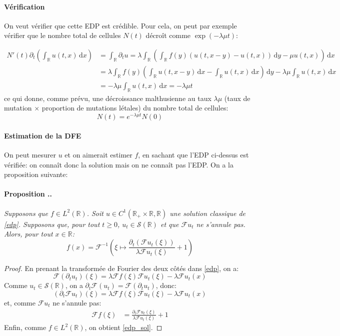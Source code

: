 \documentclass[12pt]{article}
\newcounter{prop}[section]
\newcommand{\prop}[1]{\stepcounter{prop}\paragraph{Proposition \arabic{section}.\arabic{prop}.}\textit{\newline #1}\vspace{0.1cm}}
\newcommand{\pth}[1]{\left(#1\right)}
\newcommand{\de}{\,\mathrm{d}}
\newcommand{\Er}{\mathbb{R}}
\newcommand{\dr}{\partial}
\newcommand{\fr}{\mathcal{F}}
\begin{document}
\paragraph{Vérification}

On veut vérifier que cette EDP est crédible. Pour cela, on peut par exemple vérifier que le nombre total de cellules $N(t)$ décroît comme $\exp(-\lambda\mu t)$:

\begin{align*}
    N'(t)\dr_t\pth{\int_{\Er}u(t,x)\de x}&=\int_{\Er}\dr_tu=\lambda \int_{\Er}\pth{\int_{\Er}f(y)(u(t,x-y)-u(t,x))\de y-\mu u(t,x)}\de x\\
    &=\lambda\int_{\Er}f(y)\pth{\int_{\Er}u(t,x-y)\de x-\int_{\Er}u(t,x)\de x}\de y-\lambda\mu\int_{\Er}u(t,x)\de x\\
    &=-\lambda\mu\int_{\Er}u(t,x)\de x=-\lambda\mu t
\end{align*}
ce qui donne, comme prévu, une décroissance malthusienne au taux $\lambda\mu$ (taux de mutation $\times$ proportion de mutations létales) du nombre total de cellules:
\[N(t)=e^{-\lambda\mu t}N(0)\]

\paragraph{Estimation de la DFE}

On peut mesurer $u$ et on aimerait estimer $f$, en sachant que l'EDP ci-dessus est vérifiée:  on connaît donc la solution mais on ne connaît pas l'EDP. On a la proposition suivante:
\prop{Supposons que $f\in L^2(\Er)$. Soit $u\in C^1(\Er_+\times \Er,\Er)$ une solution classique de \eqref{edp}. Supposons que, pour tout $t\geqslant 0$, $u_t\in \mathcal{S}(\Er)$ et que $\fr u_t$ ne s'annule pas. \\Alors, pour tout $x\in\mathbb{R}$:
  \begin{equation}\label{edp_sol}
    f(x)=\fr^{-1}\pth{\xi\mapsto\frac{\dr_t\pth{\fr u_t(\xi)}}{\lambda\fr u_t(\xi)}+1}    
  \end{equation}
}

\begin{proof}
  En prenant la transformée de Fourier des deux côtés dans \eqref{edp}, on a:
\[\fr \pth{\dr_tu_t}(\xi)=\lambda \fr f(\xi)\fr {u_t}(\xi)-\lambda\fr u_t(x)\]
Comme $u_t\in \mathcal{S}(\Er)$, on a $\dr_t\fr(u_t)=\fr(\dr_tu_t)$, donc:
\[\pth{\dr_t\fr u_t}(\xi)=\lambda \fr f(\xi)\fr {u_t}(\xi)-\lambda\fr u_t(x)\]
et, comme $\fr u_t$ ne s'annule pas:
\begin{align*}
\fr f(\xi)&=\frac{\dr_t\fr u_t(\xi)}{\lambda \fr u_t(\xi)}+1
\end{align*}
Enfin, comme $f\in L^2(\Er)$, on obtient \eqref{edp_sol}.

\end{proof}
\end{document}
